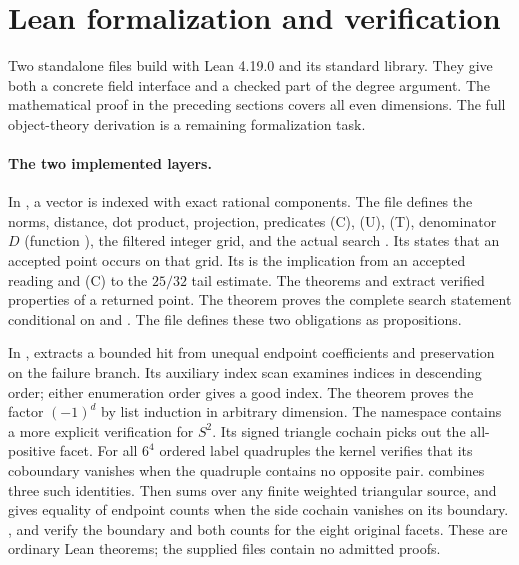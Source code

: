 \section{Lean formalization and verification}\label{sec:lean}
Two standalone files build with Lean 4.19.0 and its standard library.
They give both a concrete field interface and a checked part of the
degree argument. The mathematical proof in the preceding sections
covers all even dimensions. The full object-theory derivation is a
remaining formalization task.

\paragraph{The two implemented layers.}
In , a vector is
 indexed with exact rational components.
The file defines the norms, distance, dot product, projection,
predicates (C), (U), (T), denominator $D$ (function ),
the filtered integer grid, and the actual search
. Its  states that an accepted point
occurs on that grid. Its  is the implication from an
accepted reading and (C) to the $25/32$ tail estimate.
The theorems  and 
extract verified properties of a returned point. The theorem
 proves the complete search statement conditional on
 and . The file defines these two
obligations as propositions.

In ,  extracts a bounded
hit from unequal endpoint coefficients and preservation on the failure
branch. Its auxiliary index scan examines indices in descending order;
either enumeration order gives a good index. The theorem
 proves the factor $(-1)^d$ by list
induction in arbitrary dimension. The namespace 
contains a more explicit verification for $S^2$. Its signed triangle
cochain  picks out the all-positive facet. For all $6^4$
ordered label quadruples the kernel verifies that its coboundary
vanishes when the quadruple contains no opposite pair.
 combines three such identities. Then
 sums over any finite weighted triangular source,
and  gives equality of endpoint counts when the side
cochain vanishes on its boundary. ,
 and  verify the boundary
and both counts for the eight original facets. These are ordinary Lean
theorems; the supplied files contain no admitted proofs.

